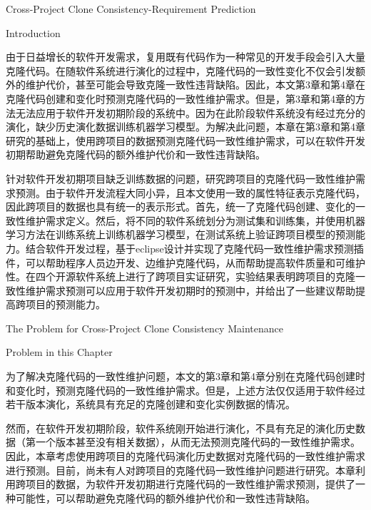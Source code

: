 
{Cross-Project Clone Consistency-Requirement Prediction}

{Introduction}

由于日益增长的软件开发需求，复用既有代码作为一种常见的开发手段会引入大量克隆代码。在随软件系统进行演化的过程中，克隆代码的一致性变化不仅会引发额外的维护代价，甚至可能会导致克隆一致性违背缺陷。因此，本文第3章和第4章在克隆代码创建和变化时预测克隆代码的一致性维护需求。但是，第3章和第4章的方法无法应用于软件开发初期阶段的系统中。因为在此阶段软件系统没有经过充分的演化，缺少历史演化数据训练机器学习模型。为解决此问题，本章在第3章和第4章研究的基础上，使用跨项目的数据预测克隆代码一致性维护需求，可以在软件开发初期帮助避免克隆代码的额外维护代价和一致性违背缺陷。

针对软件开发初期项目缺乏训练数据的问题，研究跨项目的克隆代码一致性维护需求预测。由于软件开发流程大同小异，且本文使用一致的属性特征表示克隆代码，因此跨项目的数据也具有统一的表示形式。首先，统一了克隆代码创建、变化的一致性维护需求定义。然后，将不同的软件系统划分为测试集和训练集，并使用机器学习方法在训练系统上训练机器学习模型，在测试系统上验证跨项目模型的预测能力。结合软件开发过程，基于eclipse设计并实现了克隆代码一致性维护需求预测插件，可以帮助程序人员边开发、边维护克隆代码，从而帮助提高软件质量和可维护性。在四个开源软件系统上进行了跨项目实证研究，实验结果表明跨项目的克隆一致性维护需求预测可以应用于软件开发初期时的预测中，并给出了一些建议帮助提高跨项目的预测能力。

{The Problem for Cross-Project Clone Consistency Maintenance}

{Problem in this Chapter}


为了解决克隆代码的一致性维护问题，本文的第3章和第4章分别在克隆代码创建时和变化时，预测克隆代码的一致性维护需求。但是，上述方法仅仅适用于软件经过若干版本演化，系统具有充足的克隆创建和变化实例数据的情况。

然而，在软件开发初期阶段，软件系统刚开始进行演化，不具有充足的演化历史数据（第一个版本甚至没有相关数据），从而无法预测克隆代码的一致性维护需求。因此，本章考虑使用跨项目的克隆代码演化历史数据对克隆代码的一致性维护需求进行预测。目前，尚未有人对跨项目的克隆代码一致性维护问题进行研究。本章利用跨项目的数据，为软件开发初期进行克隆代码的一致性维护需求预测，提供了一种可能性，可以帮助避免克隆代码的额外维护代价和一致性违背缺陷。

